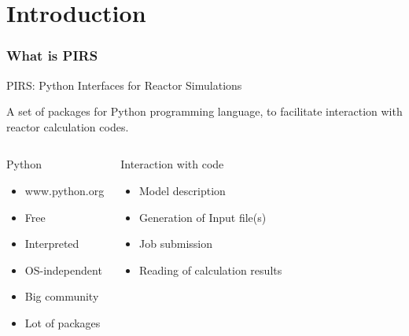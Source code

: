 \documentclass[t]{beamer}
\begin{document}
\section{Introduction}
\begin{frame}\frametitle{What is PIRS}

    \begin{block}{PIRS: Python Interfaces for Reactor Simulations}

    A set of packages for Python programming language, to facilitate
    interaction with reactor calculation codes.
    \end{block}

    \begin{columns}
    \begin{block}{Python}
    \begin{itemize}

        \item www.python.org

        \item Free 

        \item Interpreted

        \item OS-independent

        \item Big community

        \item Lot of packages 

    \end{itemize}
    \end{block}

    \begin{block}{Interaction with code}
    \begin{itemize}
        
        \item Model description

        \item Generation of Input file(s)

        \item Job submission

        \item Reading of calculation results

    \end{itemize}
    \end{block}
    \end{columns}
\end{frame}
\end{document}
